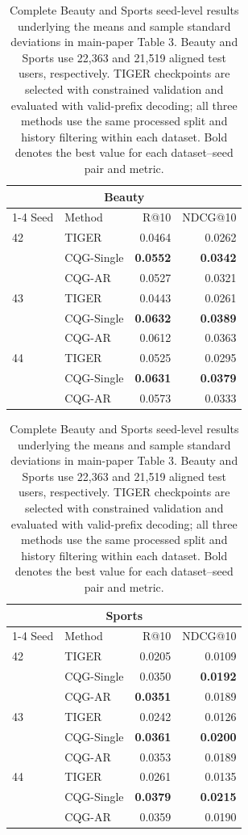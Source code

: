 \documentclass[letterpaper]{article}
\begin{document}
\begin{table}[H]
\centering
\small
\begin{minipage}[t]{0.48\textwidth}
\centering
\begin{tabular}{llrr}
\toprule
\multicolumn{4}{c}{\textbf{Beauty}} \\
\cmidrule(lr){1-4}
Seed & Method & R@10 & NDCG@10 \\
\midrule
42 & TIGER & 0.0464 & 0.0262 \\
 & CQG-Single & \textbf{0.0552} & \textbf{0.0342} \\
 & CQG-AR & 0.0527 & 0.0321 \\
43 & TIGER & 0.0443 & 0.0261 \\
 & CQG-Single & \textbf{0.0632} & \textbf{0.0389} \\
 & CQG-AR & 0.0612 & 0.0363 \\
44 & TIGER & 0.0525 & 0.0295 \\
 & CQG-Single & \textbf{0.0631} & \textbf{0.0379} \\
 & CQG-AR & 0.0573 & 0.0333 \\
\bottomrule
\end{tabular}
\end{minipage}\hfill
\begin{minipage}[t]{0.48\textwidth}
\centering
\begin{tabular}{llrr}
\toprule
\multicolumn{4}{c}{\textbf{Sports}} \\
\cmidrule(lr){1-4}
Seed & Method & R@10 & NDCG@10 \\
\midrule
42 & TIGER & 0.0205 & 0.0109 \\
 & CQG-Single & 0.0350 & \textbf{0.0192} \\
 & CQG-AR & \textbf{0.0351} & 0.0189 \\
43 & TIGER & 0.0242 & 0.0126 \\
 & CQG-Single & \textbf{0.0361} & \textbf{0.0200} \\
 & CQG-AR & 0.0353 & 0.0189 \\
44 & TIGER & 0.0261 & 0.0135 \\
 & CQG-Single & \textbf{0.0379} & \textbf{0.0215} \\
 & CQG-AR & 0.0359 & 0.0190 \\
\bottomrule
\end{tabular}
\end{minipage}
\caption{Complete Beauty and Sports seed-level results underlying the means
and sample standard deviations in main-paper Table 3. Beauty and Sports use
22,363 and 21,519 aligned test users, respectively. TIGER checkpoints are
selected with constrained validation and evaluated with valid-prefix
decoding; all three methods use the same processed split and history
filtering within each dataset. Bold denotes the best value for each
dataset--seed pair and metric.}
\label{tab:auto-tiger-results}
\end{table}
\end{document}
